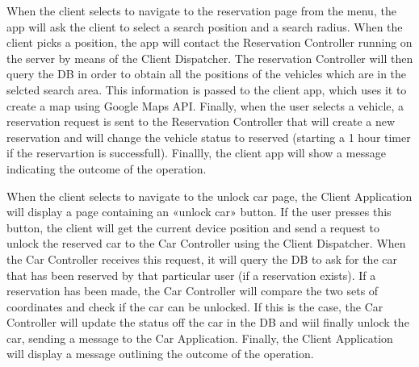 \documentclass{article}
\begin{document}
When the client selects to navigate to the reservation page from the menu, the app will ask the client to select a search position and a search radius. When the client picks a position, the app will contact the Reservation Controller running on the server by means of the Client Dispatcher. The reservation Controller will then query the DB in order to obtain all the positions of the vehicles which are in the selcted search area. This information is passed to the client app, which uses it to create a map using Google Maps API. Finally, when the user selects a vehicle, a reservation request is sent to the Reservation Controller that will create a new reservation and will change the vehicle status to reserved (starting a 1 hour timer if the reservartion is successfull). Finallly, the client app will show a message indicating the outcome of the operation.
\newpage
\begin{figure}[ht]
\end{figure}

When the client selects to navigate to the unlock car page, the Client Application will display a page containing an «unlock car» button. If the user presses this button, the client will get the current device position and send a request to unlock the reserved car to the Car Controller using the Client Dispatcher. When the Car Controller receives this request, it will query the DB to ask for the car that has been reserved by that particular user (if a reservation exists). If a reservation has been made, the Car Controller will compare the two sets of coordinates and check if the car can be unlocked. If this is the case, the Car Controller will update the status off the car in the DB and wiil finally unlock the car, sending a message to the Car Application. Finally, the Client Application will display a message outlining the outcome of the operation.

\newpage
\begin{figure}[ht]
\end{figure}
\end{document}
